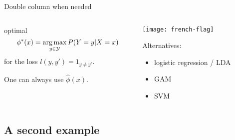 \begin{frame}{Double column when needed}
	\begin{columns}
		\begin{column}[T]{.48\textwidth}
			 optimal
			\begin{equation*}
				\phi^*(x) = \operatorname*{arg\,max}_{y\in \mathcal{Y}} P(Y=y|X=x)
			\end{equation*}
			for the loss  $l(y,y')=1_{y\neq y'}$.

			\vspace{1cm}

			One can always use  $\widehat{\phi}(x)$.
		\end{column}
		\begin{column}[T]{.48\textwidth}
			\centering
			\texttt{[image: french-flag]}

			\vspace{1cm}

			Alternatives:
			\begin{itemize}
				\item logistic regression / LDA
				\item GAM
				\item SVM
			\end{itemize}
			\vspace{1cm}

		\end{column}
	\end{columns}
\end{frame}



\subsection{A second example}
\label{sub:deuxiem_exmple}




